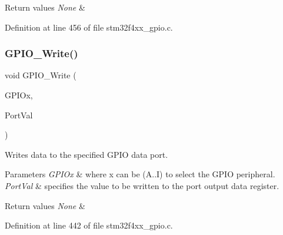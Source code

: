 \begin{DoxyRetVals}{Return values}
{\em None} & \\
\hline
\end{DoxyRetVals}


Definition at line 456 of file stm32f4xx\+\_\+gpio.\+c.

\mbox{\label{group___g_p_i_o___group2_gaa925f19c8547a00c7a0c269a84873bf9}} 
\subsubsection{\texorpdfstring{G\+P\+I\+O\+\_\+\+Write()}{GPIO\_Write()}}
{\footnotesize\ttfamily void G\+P\+I\+O\+\_\+\+Write (\begin{DoxyParamCaption}\item[{\hyperlink{struct_g_p_i_o___type_def}{G\+P\+I\+O\+\_\+\+Type\+Def} $\ast$}]{G\+P\+I\+Ox,  }\item[{uint16\+\_\+t}]{Port\+Val }\end{DoxyParamCaption})}



Writes data to the specified G\+P\+IO data port. 


\begin{DoxyParams}{Parameters}
{\em G\+P\+I\+Ox} & where x can be (A..I) to select the G\+P\+IO peripheral. \\
\hline
{\em Port\+Val} & specifies the value to be written to the port output data register. \\
\hline
\end{DoxyParams}

\begin{DoxyRetVals}{Return values}
{\em None} & \\
\hline
\end{DoxyRetVals}


Definition at line 442 of file stm32f4xx\+\_\+gpio.\+c.

\mbox{\label{group___g_p_i_o___group2_ga8f7b237fd744d9f7456fbe0da47a9b80}} 

